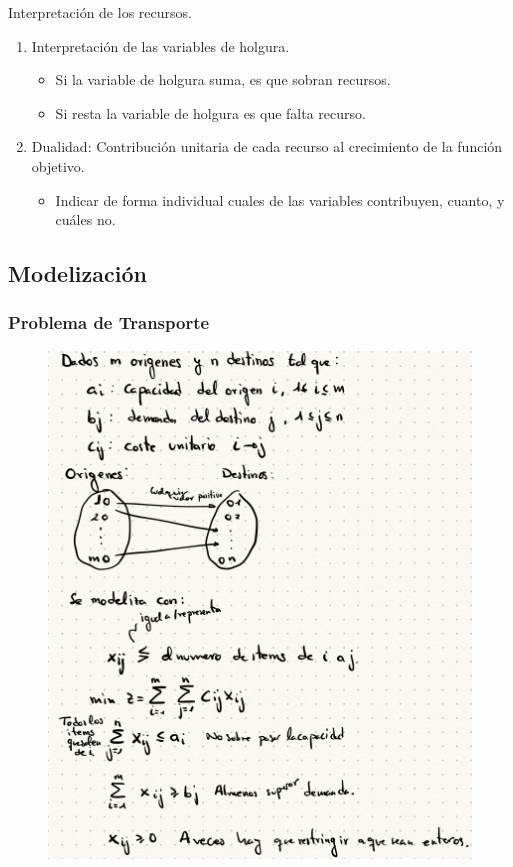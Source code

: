\documentclass[12pt, twoside, openright]{report} %
\begin{document}
Interpretación de los recursos.

\begin{enumerate}
	\item Interpretación de las variables de holgura.
	\begin{itemize}
		\item Si la variable de holgura suma, es que sobran recursos.
		\item Si resta la variable de holgura es que falta recurso.
	\end{itemize}
	\item Dualidad: Contribución unitaria de cada recurso al crecimiento de
	la función objetivo.

	\begin{itemize}
	\item Indicar de forma individual cuales de las variables contribuyen,
		cuanto, y cuáles no.
	\end{itemize}
\end{enumerate}
\pagebreak
\subsection{Modelización}

\subsubsection{Problema de Transporte}
\begin{figure}[H]
	{\includegraphics[scale=.25]{Untitled 15.png}}
\end{figure}
\end{document}
